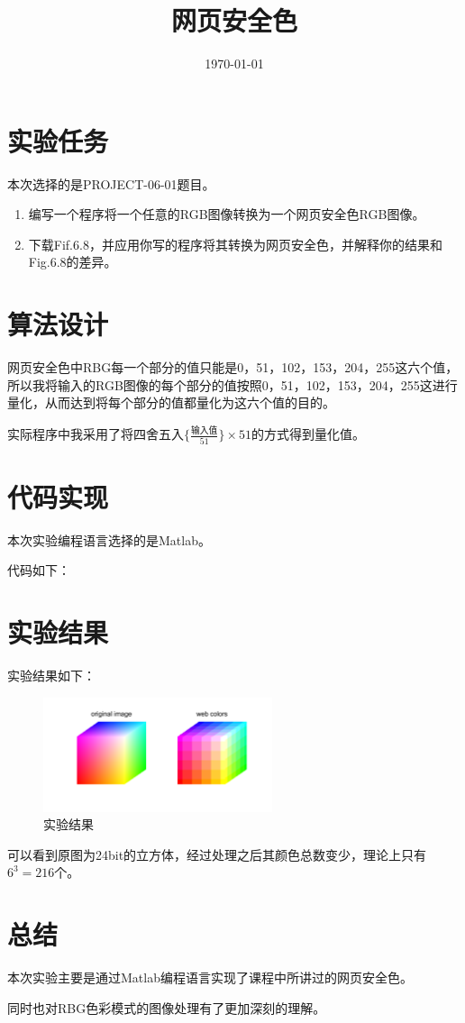 \documentclass{../source/Experiment}
\title{网页安全色}
\date{\today}
\begin{document}
\makecover
\section{实验任务}
本次选择的是PROJECT-06-01题目。


\begin{enumerate}
    \item 编写一个程序将一个任意的RGB图像转换为一个网页安全色RGB图像。
    \item 下载Fif.6.8，并应用你写的程序将其转换为网页安全色，并解释你的结果和Fig.6.8的差异。
\end{enumerate}
\section{算法设计}

网页安全色中RBG每一个部分的值只能是0，51，102，153，204，255这六个值，所以我将输入的RGB图像的每个部分的值按照0，51，102，153，204，255这进行量化，从而达到将每个部分的值都量化为这六个值的目的。

实际程序中我采用了将$\mbox{四舍五入}\{ \frac{\mbox{输入值}}{51}\} \times 51$的方式得到量化值。

\section{代码实现}
本次实验编程语言选择的是Matlab。

代码如下：



\section{实验结果}
实验结果如下：

\begin{figure}[H]
    \centering
    \includegraphics[width = 0.6\textwidth]{第三次/f1.png}
    \caption{实验结果}
\end{figure}

可以看到原图为24bit的立方体，经过处理之后其颜色总数变少，理论上只有$6^3 = 216$个。

\section{总结}
本次实验主要是通过Matlab编程语言实现了课程中所讲过的网页安全色。

同时也对RBG色彩模式的图像处理有了更加深刻的理解。
\end{document}
